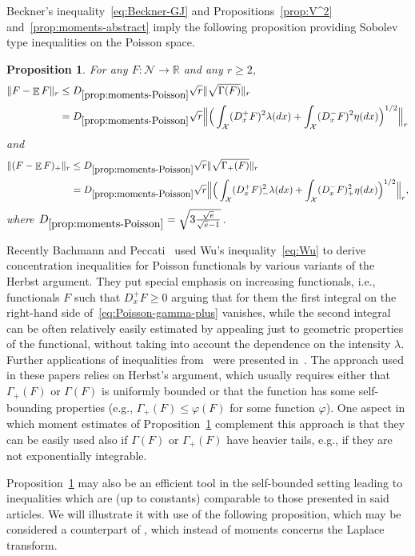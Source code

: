 \documentclass[a4paper]{amsart}
\newtheorem{proposition}[theorem]{Proposition} %
\theoremstyle{definition}
\theoremstyle{remark}
\numberwithin{equation}{section}
\newcommand*{\RR}{\mathbb{R}}
\newcommand{\fs}{D_{\ref{prop:moments-Poisson}}}
\DeclareMathOperator{\EE}{\mathbb{E}} %
\begin{document}
Beckner's inequality~\eqref{eq:Beckner-GJ} and Propositions~\ref{prop:V^2} and~\ref{prop:moments-abstract}
 imply the following proposition providing Sobolev type inequalities on the Poisson space.
\begin{proposition}\label{prop:moments-Poisson}
For any $F\colon \mathcal{N}\to \RR$ and any $r \ge 2$,
\begin{align*}
  \|F - \EE F\|_r &\le \fs \sqrt{r}\|\sqrt{\Gamma(F)}\|_r\\
  &= \fs \sqrt{r} \Big\|\Big(\int_{\mathcal{X}} (D_x^+ F)^2\lambda(dx) + \int_{\mathcal{X}}(D_x^- F)^2\eta(dx)\Big)^{1/2}\Big\|_r
\end{align*}
and
\begin{align*}
  \|(F - \EE F)_+\|_r &\le \fs \sqrt{r}\|\sqrt{\Gamma_+(F)}\|_r \\
  &= \fs \sqrt{r} \Big\|\Big(\int_{\mathcal{X}} (D_x^+ F)_-^2\lambda(dx) + \int_{\mathcal{X}}(D_x^- F)_+^2\eta(dx)\Big)^{1/2}\Big\|_r,
\end{align*}
where $\fs = \sqrt{3\frac{\sqrt{e}}{\sqrt{e}-1}}$.
\end{proposition}

Recently Bachmann and Peccati~\cite{MR3485348} used Wu's inequality~\eqref{eq:Wu} to derive concentration inequalities for Poisson functionals by various variants of the Herbst argument. They put special emphasis on increasing functionals, i.e., functionals $F$ such that $D_x^+ F \ge 0$ arguing that for them the first integral on the right-hand side of~\eqref{eq:Poisson-gamma-plus} vanishes, while the second integral can be often relatively easily estimated by appealing just to geometric properties of the functional, without taking into account the dependence on the intensity $\lambda$. Further applications of inequalities from~\cite{MR3485348} were presented in~\cite{MR3473096,MR3849811}.
The approach used in these papers relies on Herbst's argument, which usually requires either that $\Gamma_+ (F)$ or $\Gamma(F)$ is uniformly bounded or that the function has some self-bounding properties (e.g., $\Gamma_+ (F) \le \varphi(F)$ for some function $\varphi$). One aspect in which moment estimates of Proposition~\ref{prop:moments-Poisson} complement this approach is that they can be easily used also if $\Gamma(F)$ or $\Gamma_+(F)$ have heavier tails, e.g., if they are not exponentially integrable. 

Proposition~\ref{prop:moments-Poisson} may also be an efficient tool in the self-bounded setting leading to inequalities which are (up to constants) comparable to those presented in said articles. We will illustrate it with use of the following proposition, which may be considered a counterpart of \cite[Corrolary 3.5]{MR3485348}, which instead of moments concerns the Laplace transform.
\end{document}

